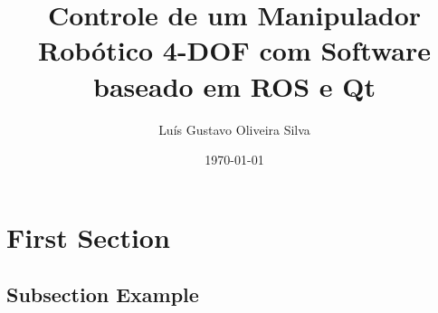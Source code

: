 \documentclass{beamer}
\title[]{Controle de um Manipulador Robótico 4-DOF com Software baseado em ROS e Qt} %
\author{Luís Gustavo Oliveira Silva} %
\institute[UFRJ] %
{
\large{Orientador: Fernando Cesar Lizarralde} \\
\medskip
Universidade Federeal do Rio de Janeiro \\ %
\textit{} %
}
\date{\today} %
\begin{document}
\begin{frame}
\titlepage %
\end{frame}



\section{First Section} %

\subsection{Subsection Example} %
\end{document}

